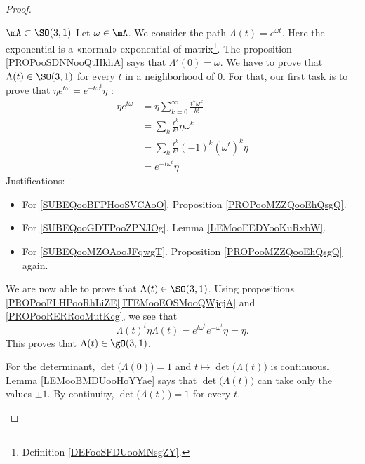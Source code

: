 \begin{proof}
\begin{subproof}
    \item[\( \mA\subset \SO(3,1)\)]
        Let \( \omega\in \mA\). We consider the path \( \Lambda(t)= e^{\omega t}\). Here the exponential is a «normal» exponential of matrix\footnote{Definition \ref{DEFooSFDUooMNsgZY}.}. The proposition \ref{PROPooSDNNooQtHkhA} says that \( \Lambda'(0)=\omega\). We have to prove that \( \Lambda(t)\in \SO(3,1)\) for every \( t\) in a neighborhood of \( 0\). For that, our first task is to prove that \( \eta e^{t\omega}= e^{-t\omega^t}\eta\) :
        \begin{subequations}
            \begin{align}
                \eta e^{t\omega}&=\eta\sum_{k=0}^{\infty}\frac{ t^k\omega^k }{ k! }\\
                &=\sum_k\frac{ t^k }{ k! }\eta\omega^k          \label{SUBEQooBFPHooSVCAoO}\\
                &=\sum_k\frac{ t^k }{ k! }(-1)^k(\omega^t)^k\eta    \label{SUBEQooGDTPooZPNJOg}\\
                &= e^{-t\omega^t}\eta        \label{SUBEQooMZOAooJFqwgT}
            \end{align}
        \end{subequations}
        Justifications:
        \begin{itemize}
            \item For \eqref{SUBEQooBFPHooSVCAoO}. Proposition \ref{PROPooMZZQooEhQsgQ}.
            \item For \eqref{SUBEQooGDTPooZPNJOg}. Lemma \ref{LEMooEEDYooKuRxbW}.
            \item For \eqref{SUBEQooMZOAooJFqwgT}. Proposition \ref{PROPooMZZQooEhQsgQ} again.
        \end{itemize}

        We are now able to prove that \( \Lambda(t)\in \SO(3,1)\). Using propositions \ref{PROPooFLHPooRhLiZE}\ref{ITEMooEOSMooQWjcjA} and \ref{PROPooRERRooMutKcg}, we see that
        \begin{equation}
            \Lambda(t)^t\eta\Lambda(t)= e^{t\omega^t} e^{-\omega^t}\eta=\eta.
        \end{equation}
        This proves that \( \Lambda(t)\in \gO(3,1)\).

        For the determinant, \( \det\big( \Lambda(0) \big)=1\) and \( t\mapsto \det\big( \Lambda(t) \big)\) is continuous. Lemma \ref{LEMooBMDUooHoYYae} says that \( \det\big( \Lambda(t) \big)\) can take only the values \( \pm1\). By continuity, \( \det\big( \Lambda(t) \big)=1\) for every \( t\).
    \end{subproof}
\end{proof}

